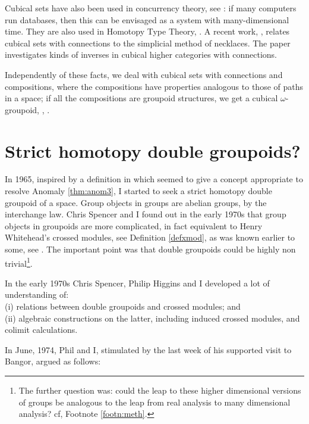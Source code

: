 \documentclass{elsarticle}
\begin{document}
Cubical sets have also been used in concurrency theory, see \cite{goubault-geometric}:  if many computers run databases, then this can be envisaged as a system with many-dimensional time. They are also used in Homotopy Type Theory, \cite{CCHM}. A recent work, \cite{RZ16}, relates cubical sets with connections to the simplicial method of necklaces. The paper \cite{Lucas} investigates kinds of inverses in cubical higher categories with connections.

Independently of these facts, we deal with cubical sets with connections and compositions,
where the compositions have properties analogous to those of paths in a space; if all the compositions are groupoid structures, we get a cubical $\omega$-groupoid, \cite{BH81algcub}, \cite{BHS}.

\section{Strict homotopy double groupoids?}
In 1965, inspired by a definition in \cite{Ehresmann-65} which seemed to give a concept appropriate to resolve Anomaly \ref{thm:anom3},   I started to seek a strict homotopy double groupoid of a space.
Group objects in groups are abelian groups, by the interchange law.  Chris Spencer and
I found out in the early 1970s that group objects in groupoids are more complicated, in fact
equivalent to Henry Whitehead's crossed modules, see Definition  \ref{defxmod}, as was known earlier to some, see \cite{BS1}. The important point was that double groupoids could be highly non trivial\footnote{The further question was: could the leap to these higher dimensional versions of groups  be analogous to the leap from real analysis to many dimensional analysis? cf, Footnote \ref{footn:meth}.}.


In the early 1970s Chris Spencer, Philip Higgins and I developed a lot of understanding of: \\
(i) relations between double groupoids and crossed modules; and\\
(ii) algebraic constructions on the latter, including induced crossed modules, and colimit calculations.


In June, 1974,  Phil and I, stimulated by the last week of his supported visit to Bangor, argued as follows:
\end{document}

